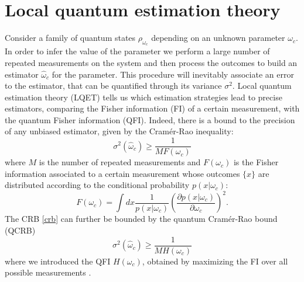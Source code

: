 \documentclass[ pra,a4paper,aps,twocolumn,superscriptaddress]{revtex4-1}
\begin{document}
\section{Local quantum estimation theory}\label{sec:3}
Consider a family of quantum states $\rho_{\omega_c} $ depending on an unknown  parameter $\omega_{c}$. In order to infer the value of the parameter  we perform a large number of repeated measurements on the system and then process the outcomes to build an estimator $\hat{\omega}_c$ for the parameter. This procedure will inevitably associate an error to the estimator, that can be quantified through its variance $\sigma^2$.
Local quantum estimation theory (LQET) tells us which estimation strategies lead to  precise estimators, comparing the Fisher information (FI) of a certain measurement, with the quantum Fisher information (QFI).
Indeed, there is a bound to the precision of any  unbiased estimator, given by the Cram\'er-Rao inequality:
\begin{equation}
\sigma^2(\hat{\omega}_c)\ge\frac{1}{M F(\omega_c)} 
\label{crb}
\end{equation}
where $M$ is the number of repeated measurements and $F(\omega_c)$ is the Fisher
information associated to a certain measurement whose outcomes $\{x\}$ are distributed according to the conditional probability $p(x|\omega_c)$:
\begin{equation}
F(\omega_c)=\int dx \frac{1}{p(x|\omega_c)}\left(\frac{\partial p(x|\omega_c)}{\partial\omega_c}\right)^2.
\end{equation}
The CRB \eqref{crb} can  further be bounded by the quantum Cram\'er-Rao bound (QCRB)
\begin{equation}
\sigma^2(\hat{\omega}_c)\ge\frac{1}{M H(\omega_c)} 
\label{qcrb}
\end{equation}
where we introduced the QFI $H(\omega_c)$, obtained by maximizing the FI over all possible measurements \cite{parisQE}.
\end{document}
